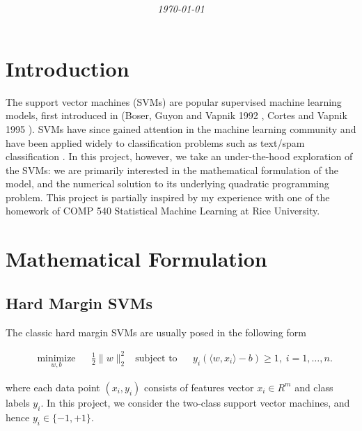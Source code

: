 \documentclass[10pt]{article}
\title{
	\textbf{\documentTitle}
}
\author{\textit{\documentAuthors}}
\date{\textit{\today}}
\begin{document}
\maketitle
	
\section{Introduction} 

The support vector machines (SVMs) are popular supervised machine learning models, first introduced in (Boser, Guyon and Vapnik 1992 \cite{boser1992training}, Cortes and Vapnik 1995 \cite{cortes1995support}). SVMs have since gained attention in the machine learning community and have been applied widely to classification problems such as text/spam classification \cite{joachims1998text} \cite{tong2001support}. In this project, however, we take an under-the-hood exploration of the SVMs: we are primarily interested in the mathematical formulation of the model, and the numerical solution to its underlying quadratic programming problem. This project is partially inspired by my experience with one of the homework of COMP 540 Statistical Machine Learning at Rice University.  

\section{Mathematical Formulation}
\subsection{Hard Margin SVMs}

The classic hard margin SVMs are usually posed in the following form

\begin{equation}\label{eq:1}
\begin{aligned}
& \underset{w,b}{\text{minimize}}
& & \frac{1}{2} \lVert w \rVert_{2}^2 
& \text{subject to}
& & y_i(\langle w,x_i \rangle - b) \geq 1, \; i = 1, \ldots, n.
\end{aligned}
\end{equation}

where each data point $(x_i,y_i)$ consists of features vector $x_i \in R^m$ and class labels $y_i$. In this project, we consider the two-class support vector machines, and hence $y_i \in \{-1, +1\}$. 
\end{document}
